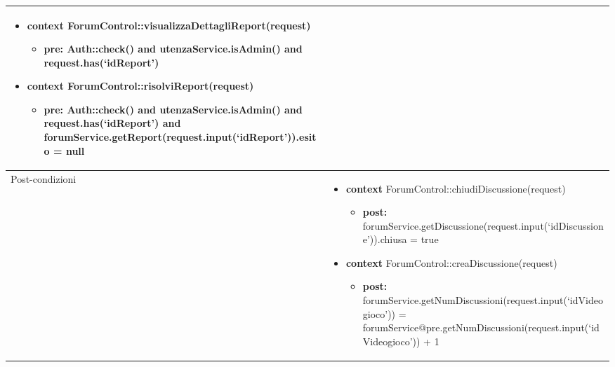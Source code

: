 \begin{tabular}{|| l | p{28em} ||}
\begin{itemize}[leftmargin=*]
	\item \textbf{context} ForumControl::visualizzaDettagliReport(request)
	\begin{itemize}
		\item[ ] \textbf{pre:} Auth::check() and utenzaService.isAdmin() and request.has(‘idReport’)
	\end{itemize}
	
	\item \textbf{context} ForumControl::risolviReport(request)
	\begin{itemize}
		\item[ ] \textbf{pre:} Auth::check() and utenzaService.isAdmin() and request.has(‘idReport’) and forumService.getReport(request.input(‘idReport’)).esito = null
	\end{itemize}
\end{itemize}\\
\hline
Post-condizioni & \begin{itemize}[leftmargin=*]
	\item \textbf{context} ForumControl::chiudiDiscussione(request)
	\begin{itemize}
		\item[ ] \textbf{post:} forumService.getDiscussione(request.input(‘idDiscussione’)).chiusa = true
	\end{itemize}

	\item \textbf{context} ForumControl::creaDiscussione(request)
	\begin{itemize}
		\item[ ] \textbf{post:} forumService.getNumDiscussioni(request.input(‘idVideogioco’)) = forumService@pre.getNumDiscussioni(request.input(‘idVideogioco’)) + 1
	\end{itemize}

\end{itemize}\\
\hline
\end{tabular}

\newpage
